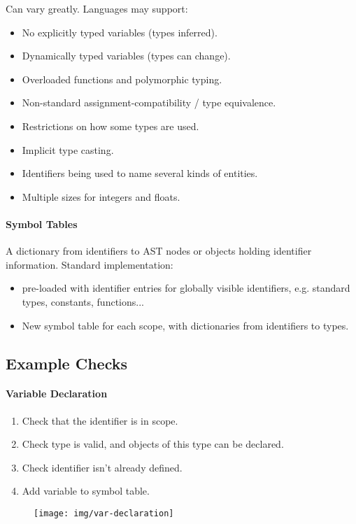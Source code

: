 \documentclass[twocolumn,english]{article}
\let\emph\relax
\begin{document}
Can vary greatly. Languages may support: 
\begin{itemize}
\item No explicitly typed variables (types inferred). 
\item Dynamically typed variables (types can change). 
\item Overloaded functions and polymorphic typing. 
\item Non-standard assignment-compatibility / type equivalence. 
\item Restrictions on how some types are used. 
\item Implicit type casting. 
\item Identifiers being used to name several kinds of entities. 
\item Multiple sizes for integers and floats. 
\end{itemize}

\paragraph{Symbol Tables}

A dictionary from identifiers to AST nodes or objects holding identifier
information. Standard implementation: 
\begin{itemize}
\item \emph{Top-level symbol table} pre-loaded with identifier entries for
globally visible identifiers, e.g. standard types, constants, functions... 
\item New symbol table for each scope, with dictionaries from identifiers
to types. 
\end{itemize}

\subsection{Example Checks}

\paragraph{Variable Declaration}
\begin{enumerate}
\item Check that the identifier is in scope. 
\item Check type is valid, and objects of this type can be declared. 
\item Check identifier isn't already defined. 
\item Add variable to symbol table. 
\end{enumerate}
\begin{figure}[H]
\centering{}\texttt{[image: img/var-declaration]} 
\end{figure}
\end{document}
